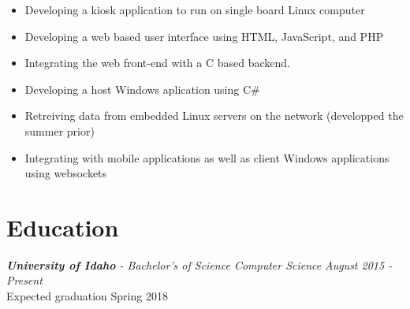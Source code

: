\documentclass[10pt]{article}
\begin{document}
    \begin{adjustwidth}{5mm}{}
      \begin{itemize}[noitemsep,nolistsep]
        \item Developing a kiosk application to run on single board Linux computer
        \item Developing a web based user interface using HTML, JavaScript, and PHP
        \item Integrating the web front-end with a C based backend.
        \item Developing a host Windows aplication using C\#
        \item Retreiving data from embedded Linux servers on the network (developped the summer prior)
        \item Integrating with mobile applications as well as client Windows applications using websockets
     \end{itemize}
    \end{adjustwidth}
\vspace{4mm}
\section*{Education}
  \vspace{2mm}
  \textit{\textbf{University of Idaho} - Bachelor's of Science Computer Science} \hfill \textit{August 2015 - Present}
  \\ Expected graduation Spring 2018
\end{document}

